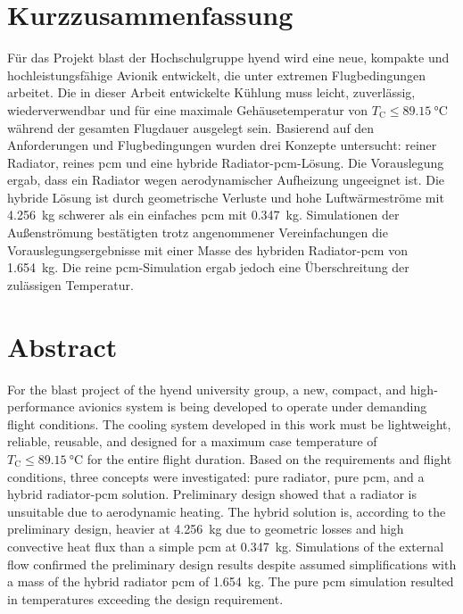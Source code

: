 \chapter*{Kurzzusammenfassung} %
\label{chap:Kurzzusammenfassung}


Für das Projekt \ac{blast} der Hochschulgruppe \ac{hyend} wird eine neue, kompakte und hochleistungsfähige Avionik entwickelt,
die unter extremen Flugbedingungen arbeitet. Die in dieser Arbeit entwickelte Kühlung muss leicht, zuverlässig, wiederverwendbar und für eine
maximale Gehäusetemperatur von $T_\mathrm{C} \leq \SI{89.15}{\celsius}$ während der gesamten Flugdauer ausgelegt sein.
Basierend auf den Anforderungen und Flugbedingungen
wurden drei Konzepte untersucht: reiner Radiator, reines \ac{pcm} und eine hybride Radiator-\ac{pcm}-Lösung. Die Vorauslegung
ergab, dass ein Radiator wegen aerodynamischer Aufheizung ungeeignet ist. Die hybride Lösung ist durch geometrische
Verluste und hohe Luftwärmeströme mit \SI{4,256}{\kilogram} schwerer als ein einfaches \ac{pcm}
mit \SI{0,347}{\kilogram}. Simulationen der Außenströmung
bestätigten trotz angenommener Vereinfachungen die Vorauslegungsergebnisse mit einer Masse des hybriden Radiator-\ac{pcm} von \SI{1,654}{\kilogram}.
Die reine \ac{pcm}-Simulation ergab jedoch eine Überschreitung der zulässigen Temperatur.

\chapter*{Abstract} %
\label{chap:Abstract}
For the \ac{blast} project of the \ac{hyend} university group, a new, compact, and high-performance avionics system is being developed to
operate under demanding flight conditions. The cooling system developed in this work must be lightweight, reliable, reusable, and designed for a maximum
case temperature of $T_\mathrm{C} \leq \SI{89.15}{\celsius}$ for the entire flight duration.
Based on the requirements and flight conditions, three concepts were investigated: pure radiator, pure \ac{pcm}, and a hybrid radiator-\ac{pcm}
solution. Preliminary design showed that a radiator is unsuitable due to aerodynamic heating. The hybrid solution is, according to
the preliminary design, heavier at \SI{4,256}{\kilogram} due to geometric losses and high convective heat flux than a simple \ac{pcm} at
\SI{0,347}{\kilogram}. Simulations of the external flow confirmed the preliminary design results despite assumed
simplifications with a mass of the hybrid radiator \ac{pcm} of \SI{1,654}{\kilogram}. The pure \ac{pcm} simulation resulted in temperatures
exceeding the design requirement.
